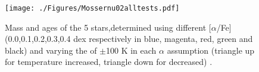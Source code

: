 \documentclass{aa}
\begin{document}
\begin{appendix}



   \begin{figure}
   \centering
   \texttt{[image: ./Figures/Mossernu02alltests.pdf]}
   \caption{Mass and ages of the 5 stars,determined using different [$\alpha$/Fe] (0.0,0.1,0.2,0.3,0.4 dex respectively in blue, magenta, red, green and black) and varying the \Teff  of $\pm$100 K in each $\alpha$ assumption (triangle up for temperature increased, triangle down for decreased) .}
              \label{Fig:Benoitalltests}%
    \end{figure}



\end{appendix}
\end{document}
